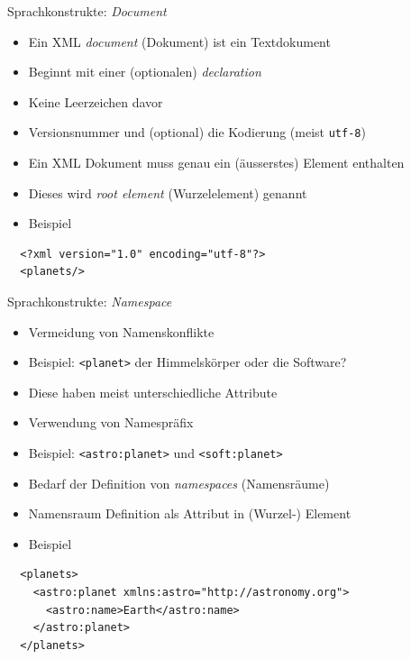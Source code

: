 \documentclass{beamer}
\begin{document}
\begin{frame}[fragile]{Sprachkonstrukte: \emph{Document}}
	
	\begin{itemize}
		\item Ein XML \emph{document} (Dokument) ist ein Textdokument
		\item Beginnt mit einer (optionalen) \emph{declaration}
		\item Keine Leerzeichen davor
		\item Versionsnummer und (optional) die Kodierung (meist \texttt{utf-8})
		\item Ein XML Dokument muss genau ein (äusserstes) Element enthalten \item Dieses wird \emph{root element} (Wurzelelement) genannt
		\item Beispiel
	\end{itemize}
	
	\begin{lstlisting}
  <?xml version="1.0" encoding="utf-8"?>
  <planets/>
	\end{lstlisting}
	
\end{frame}

\begin{frame}[fragile]{Sprachkonstrukte: \emph{Namespace}}
	
	\begin{itemize}
		\item Vermeidung von Namenskonflikte
		\item Beispiel: \texttt{<planet>} der Himmelskörper oder die Software?
		\item Diese haben meist unterschiedliche Attribute
		\item Verwendung von Namespräfix
		\item Beispiel: \texttt{<astro:planet>} und \texttt{<soft:planet>}
		\item Bedarf der Definition von \emph{namespaces} (Namensräume)
		\item Namensraum Definition als Attribut in (Wurzel-) Element
		\item Beispiel
	\end{itemize}
	
	\begin{lstlisting}
  <planets>
    <astro:planet xmlns:astro="http://astronomy.org">
      <astro:name>Earth</astro:name>
    </astro:planet>
  </planets>
	\end{lstlisting}
	
\end{frame}
\end{document}
